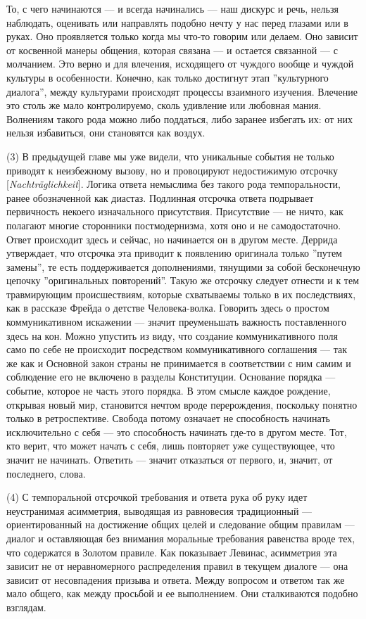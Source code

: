\documentclass[12pt]{book}
\begin{document}
То, с чего начинаются --- и всегда начинались --- наш дискурс и речь, нельзя наблюдать, оценивать или направлять подобно нечту у нас перед глазами или в руках. Оно проявляется только когда мы что-то говорим или делаем. Оно зависит от косвенной манеры общения, которая связана --- и остается связанной --- с молчанием. Это верно и для влечения, исходящего от чуждого вообще и чуждой культуры в особенности. Конечно, как только достигнут этап ''культурного диалога'', между культурами происходят процессы взаимного изучения. Влечение это столь же мало контролируемо, сколь удивление или любовная мания. Волнениям такого рода можно либо поддаться, либо заранее избегать их: от них нельзя избавиться, они становятся как воздух.

(3) В предыдущей главе мы уже видели, что уникальные события не только приводят к неизбежному вызову, но и провоцируют недостижимую отсрочку [\textit{Nachträglichkeit}]. Логика ответа немыслима без такого рода темпоральности, ранее обозначенной как диастаз. Подлинная отсрочка ответа подрывает первичность некоего изначального присутствия. Присутствие --- не ничто, как полагают многие сторонники постмодернизма, хотя оно и не самодостаточно. Ответ происходит здесь и сейчас, но начинается он в другом месте. Деррида утверждает, что отсрочка эта приводит к появлению оригинала только ''путем замены'', те есть поддерживается дополнениями, тянущими за собой бесконечную цепочку ''оригинальных повторений''. Такую же отсрочку следует отнести и к тем травмирующим происшествиям, которые схватываемы только в их последствиях, как в рассказе Фрейда о детстве Человека-волка. Говорить здесь о простом коммуникативном искажении --- значит преуменьшать важность поставленного здесь на кон. Можно упустить из виду, что создание коммуникативного поля само по себе не происходит посредством коммуникативного соглашения --- так же как и Основной закон страны не принимается в соответствии с ним самим и соблюдение его не включено в разделы Конституции. Основание порядка --- событие, которое не часть этого порядка. В этом смысле каждое рождение, открывая новый мир, становится нечтом вроде перерождения, поскольку понятно только в ретроспективе. Свобода потому означает не способность начинать исключительно с себя --- это способность начинать где-то в другом месте. Тот, кто верит, что может начать с себя, лишь повторяет уже существующее, что значит не начинать. Ответить --- значит отказаться от первого, и, значит, от последнего, слова.

(4) С темпоральной отсрочкой требования и ответа рука об руку идет неустранимая асимметрия, выводящая из равновесия традиционный --- ориентированный на достижение общих целей и следование общим правилам --- диалог и оставляющая без внимания моральные требования равенства вроде тех, что содержатся в Золотом правиле. Как показывает Левинас, асимметрия эта зависит не от неравномерного распределения правил в текущем диалоге --- она зависит от несовпадения призыва и ответа. Между вопросом и ответом так же мало общего, как между просьбой и ее выполнением. Они сталкиваются подобно взглядам.
\end{document}
